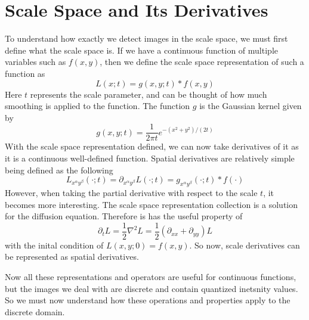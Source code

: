\documentclass{article}
\begin{document}
\section{Scale Space and Its Derivatives}
To understand how exactly we detect images in the scale space, we must first define what the scale space is.
If we have a continuous function of multiple variables such as $f(x,y)$, then we define the scale space representation of such a function as 
\begin{equation}
  L(x;t) = g(x,y;t) * f(x,y)
\end{equation}
Here $t$ represents the scale parameter, and can be thought of how much smoothing is applied to the function. The function $g$ is the Gaussian kernel given by
\begin{equation}
  g(x,y;t) = \frac{1}{2 \pi t}e^{-(x^2+y^2)/(2t)}
\end{equation}
With the scale space representation defined, we can now take derivatives of it as it is a continuous well-defined function.
Spatial derivatives are relatively simple being defined as the following
\begin{equation}
  L_{x^{\alpha}y^{\beta}}(\cdot;t) = \partial_{x^{\alpha}y^{\beta}}L(\cdot;t) = g_{x^{\alpha}y^{\beta}}(\cdot;t) * f(\cdot)
\end{equation}
However, when taking the partial derivative with respect to the scale $t$, it becomes more interesting.
The scale space representation collection is a solution for the diffusion equation. Therefore is has the useful property of 
\begin{equation}
  \partial_t L = \frac{1}{2} \nabla^2 L = \frac{1}{2} (\partial_{xx} + \partial_{yy})L
\end{equation}
with the inital condition of $L(x,y;0) = f(x,y)$.
So now, scale derivatives can be represented as spatial derivatives. 

Now all these representations and operators are useful for continuous functions, but the images we deal with are discrete and contain quantized inetsnity values.
So we must now understand how these operations and properties apply to the discrete domain.
\end{document}
